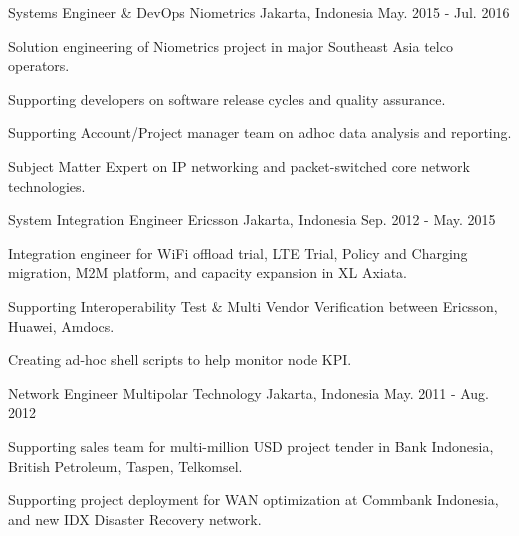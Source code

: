 \begin{cventries}
  \cventry
    {Systems Engineer \& DevOps} %
    {Niometrics} %
    {Jakarta, Indonesia} %
    {May. 2015 - Jul. 2016} %
    {
      \begin{cvitems} %
        \item {Solution engineering of Niometrics project in major Southeast Asia telco operators.}
        \item {Supporting developers on software release cycles and quality assurance.}
        \item {Supporting Account/Project manager team on adhoc data analysis and reporting.}
        \item {Subject Matter Expert on IP networking and packet-switched core network technologies.}
      \end{cvitems}
    }

  \cventry
    {System Integration Engineer} %
    {Ericsson} %
    {Jakarta, Indonesia} %
    {Sep. 2012 - May. 2015} %
    {
      \begin{cvitems} %
        \item {Integration engineer for WiFi offload trial, LTE Trial, Policy and Charging migration, M2M platform, and capacity expansion in XL Axiata.}
        \item {Supporting Interoperability Test \& Multi Vendor Verification between Ericsson, Huawei, Amdocs.}
        \item {Creating ad-hoc shell scripts to help monitor node KPI.}
      \end{cvitems}
    }

  \cventry
    {Network Engineer} %
    {Multipolar Technology} %
    {Jakarta, Indonesia} %
    {May. 2011 - Aug. 2012} %
    {
      \begin{cvitems} %
        \item {Supporting sales team for multi-million USD project tender in Bank Indonesia, British Petroleum, Taspen, Telkomsel.}
        \item {Supporting project deployment for WAN optimization at Commbank Indonesia, and new IDX Disaster Recovery network.}
      \end{cvitems}
    }

\end{cventries}
